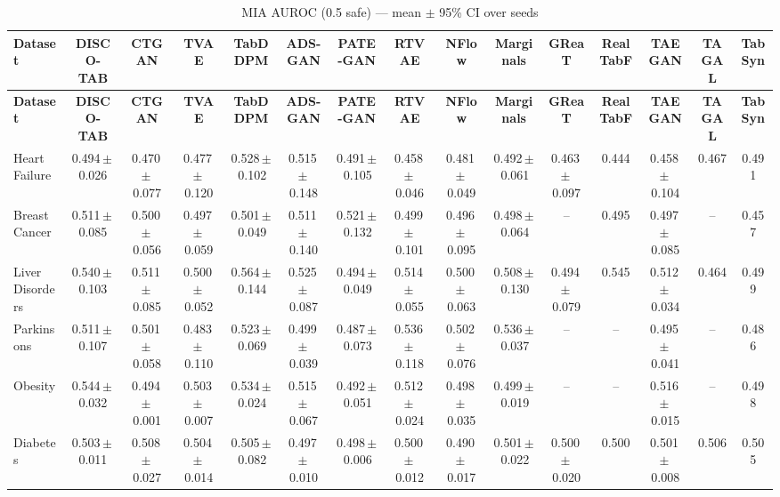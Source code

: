 \documentclass[8pt]{extarticle}
\begin{document}
\begin{longtable}{l*{14}{c}}
\caption{MIA AUROC (0.5 safe) --- mean $\pm$ 95\% CI over seeds}\\
\toprule
\textbf{Dataset} & \textbf{DISCO-TAB} & \textbf{CTGAN} & \textbf{TVAE} & \textbf{TabDDPM} & \textbf{ADS-GAN} & \textbf{PATE-GAN} & \textbf{RTVAE} & \textbf{NFlow} & \textbf{Marginals} & \textbf{GReaT} & \textbf{RealTabF} & \textbf{TAEGAN} & \textbf{TAGAL} & \textbf{TabSyn} \\
\midrule
\endfirsthead
\toprule
\textbf{Dataset} & \textbf{DISCO-TAB} & \textbf{CTGAN} & \textbf{TVAE} & \textbf{TabDDPM} & \textbf{ADS-GAN} & \textbf{PATE-GAN} & \textbf{RTVAE} & \textbf{NFlow} & \textbf{Marginals} & \textbf{GReaT} & \textbf{RealTabF} & \textbf{TAEGAN} & \textbf{TAGAL} & \textbf{TabSyn} \\
\midrule
\endhead
\bottomrule
\endfoot
Heart Failure & 0.494\,$\pm$\,0.026 & 0.470\,$\pm$\,0.077 & 0.477\,$\pm$\,0.120 & 0.528\,$\pm$\,0.102 & 0.515\,$\pm$\,0.148 & 0.491\,$\pm$\,0.105 & 0.458\,$\pm$\,0.046 & 0.481\,$\pm$\,0.049 & 0.492\,$\pm$\,0.061 & 0.463\,$\pm$\,0.097 & 0.444 & 0.458\,$\pm$\,0.104 & 0.467 & 0.491 \\
Breast Cancer & 0.511\,$\pm$\,0.085 & 0.500\,$\pm$\,0.056 & 0.497\,$\pm$\,0.059 & 0.501\,$\pm$\,0.049 & 0.511\,$\pm$\,0.140 & 0.521\,$\pm$\,0.132 & 0.499\,$\pm$\,0.101 & 0.496\,$\pm$\,0.095 & 0.498\,$\pm$\,0.064 & -- & 0.495 & 0.497\,$\pm$\,0.085 & -- & 0.457 \\
Liver Disorders & 0.540\,$\pm$\,0.103 & 0.511\,$\pm$\,0.085 & 0.500\,$\pm$\,0.052 & 0.564\,$\pm$\,0.144 & 0.525\,$\pm$\,0.087 & 0.494\,$\pm$\,0.049 & 0.514\,$\pm$\,0.055 & 0.500\,$\pm$\,0.063 & 0.508\,$\pm$\,0.130 & 0.494\,$\pm$\,0.079 & 0.545 & 0.512\,$\pm$\,0.034 & 0.464 & 0.499 \\
Parkinsons & 0.511\,$\pm$\,0.107 & 0.501\,$\pm$\,0.058 & 0.483\,$\pm$\,0.110 & 0.523\,$\pm$\,0.069 & 0.499\,$\pm$\,0.039 & 0.487\,$\pm$\,0.073 & 0.536\,$\pm$\,0.118 & 0.502\,$\pm$\,0.076 & 0.536\,$\pm$\,0.037 & -- & -- & 0.495\,$\pm$\,0.041 & -- & 0.486 \\
Obesity & 0.544\,$\pm$\,0.032 & 0.494\,$\pm$\,0.001 & 0.503\,$\pm$\,0.007 & 0.534\,$\pm$\,0.024 & 0.515\,$\pm$\,0.067 & 0.492\,$\pm$\,0.051 & 0.512\,$\pm$\,0.024 & 0.498\,$\pm$\,0.035 & 0.499\,$\pm$\,0.019 & -- & -- & 0.516\,$\pm$\,0.015 & -- & 0.498 \\
Diabetes & 0.503\,$\pm$\,0.011 & 0.508\,$\pm$\,0.027 & 0.504\,$\pm$\,0.014 & 0.505\,$\pm$\,0.082 & 0.497\,$\pm$\,0.010 & 0.498\,$\pm$\,0.006 & 0.500\,$\pm$\,0.012 & 0.490\,$\pm$\,0.017 & 0.501\,$\pm$\,0.022 & 0.500\,$\pm$\,0.020 & 0.500 & 0.501\,$\pm$\,0.008 & 0.506 & 0.505 \\

\end{longtable}
\end{document}

